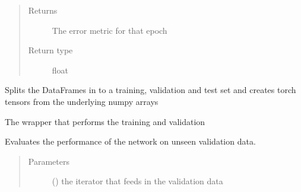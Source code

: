 \documentclass[letterpaper,10pt,english]{sphinxmanual}
\begin{document}
\begin{fulllineitems}
\begin{fulllineitems}
\begin{quote}
\begin{description}
\item[{Returns}] \leavevmode
The error metric for that epoch

\item[{Return type}] \leavevmode
float

\end{description}\end{quote}

\end{fulllineitems}


\begin{fulllineitems}
\label{\detokenize{index:Forecaster.deeplearning.DeepLearning.train_val_test}}
Splits the DataFrames in to a training, validation
and test set and creates torch tensors from the underlying
numpy arrays

\end{fulllineitems}


\begin{fulllineitems}
\label{\detokenize{index:Forecaster.deeplearning.DeepLearning.training_wrapper}}
The wrapper that performs the training and validation

\end{fulllineitems}


\begin{fulllineitems}
\label{\detokenize{index:Forecaster.deeplearning.DeepLearning.validate}}
Evaluates the performance of the network on unseen validation data.
\begin{quote}\begin{description}
\item[{Parameters}] \leavevmode
{} () \textendash{} the iterator that feeds in the validation data


\end{description}
\end{quote}
\end{fulllineitems}
\end{fulllineitems}
\end{document}
